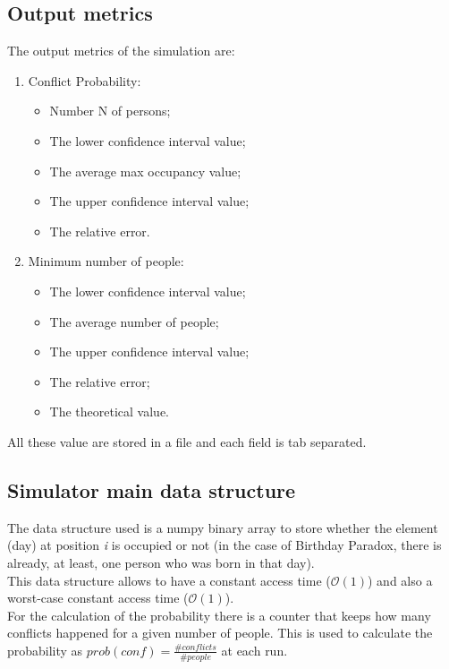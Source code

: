 \documentclass[twocolumn,letterpaper]{report}
\begin{document}
{	\subsection{Output metrics}
			The output metrics of the simulation are:
			\begin{enumerate}
					\item Conflict Probability:
					\begin{itemize}
							\item Number N of persons;
							\item The lower confidence interval value;
							\item The average max occupancy value;
							\item The upper confidence interval value;
							\item The relative error.
					\end{itemize}
					\item Minimum number of people:
					\begin{itemize}
							\item The lower confidence interval value;
							\item The average number of people;
							\item The upper confidence interval value;
							\item The relative error;
							\item The theoretical value.
					\end{itemize}
			\end{enumerate}
			All these value are stored in a file and each field is tab separated.
	
	\subsection{Simulator main data structure}
				The data structure used is a numpy binary array to store whether the element (day) at position \emph{i} is occupied or not (in the case of Birthday Paradox, there is already, at least, one person who was born in that day). \\ 
				This data structure allows to have a constant access time ($\mathcal{O}(1)$) and also a worst-case constant access time ($\mathcal{O}(1)$). \\
				For the calculation of the probability there is a counter that keeps how many conflicts happened for a given number of people. This is used to calculate the probability as $prob(conf)=\frac{\#conflicts}{\#people}$ at each run. \\
			
}
\end{document}

